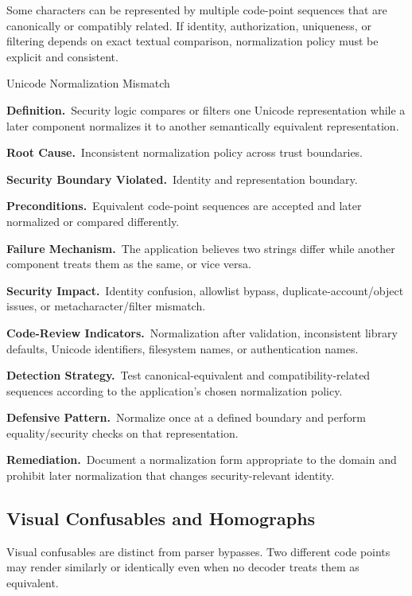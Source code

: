 \documentclass[11pt]{article}
\newcommand{\field}[1]{\par\smallskip\noindent\textbf{#1.}\ }
\begin{document}
Some characters can be represented by multiple code-point sequences that are canonically or compatibly related. If identity, authorization, uniqueness, or filtering depends on exact textual comparison, normalization policy must be explicit and consistent.

\begin{catalogbox}{Unicode Normalization Mismatch}
\field{Definition}Security logic compares or filters one Unicode representation while a later component normalizes it to another semantically equivalent representation.

\field{Root Cause}Inconsistent normalization policy across trust boundaries.

\field{Security Boundary Violated}Identity and representation boundary.

\field{Preconditions}Equivalent code-point sequences are accepted and later normalized or compared differently.

\field{Failure Mechanism}The application believes two strings differ while another component treats them as the same, or vice versa.

\field{Security Impact}Identity confusion, allowlist bypass, duplicate-account/object issues, or metacharacter/filter mismatch.

\field{Code-Review Indicators}Normalization after validation, inconsistent library defaults, Unicode identifiers, filesystem names, or authentication names.

\field{Detection Strategy}Test canonical-equivalent and compatibility-related sequences according to the application's chosen normalization policy.

\field{Defensive Pattern}Normalize once at a defined boundary and perform equality/security checks on that representation.

\field{Remediation}Document a normalization form appropriate to the domain and prohibit later normalization that changes security-relevant identity.
\end{catalogbox}
\clearpage

\subsection{Visual Confusables and Homographs}

Visual confusables are distinct from parser bypasses. Two different code points may render similarly or identically even when no decoder treats them as equivalent.
\end{document}

